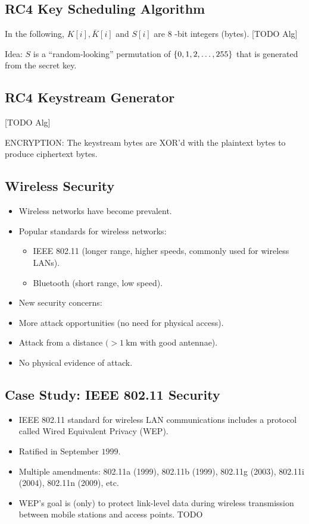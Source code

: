 \subsection*{RC4 Key Scheduling Algorithm}
In the following, $K[i], \bar{K}[i]$ and $S[i]$ are 8 -bit integers (bytes).
      [TODO Alg]

Idea: $S$ is a ``random-looking'' permutation of
$\{0,1,2, \ldots, 255\}$ that is generated from the secret key.

\subsection*{RC4 Keystream Generator}
[TODO Alg]

ENCRYPTION\@: The keystream bytes are XOR'd with the
plaintext bytes to produce ciphertext bytes.

\subsection*{Wireless Security}
\begin{itemize}
      \item Wireless networks have become prevalent.
      \item Popular standards for wireless networks:
            \begin{itemize}
                  \item IEEE 802.11
                        (longer range, higher speeds, commonly used for wireless LANs).
                  \item Bluetooth (short range, low speed).
            \end{itemize}
      \item New security concerns:
      \item More attack opportunities (no need for physical access).
      \item Attack from a distance $(>1 \mathrm{~km}$ with good antennae).
      \item No physical evidence of attack.
\end{itemize}

\subsection*{Case Study: IEEE 802.11 Security}
\begin{itemize}
      \item IEEE 802.11 standard for wireless LAN communications includes a protocol called Wired Equivalent Privacy (WEP).
      \item Ratified in September $1999$.
      \item Multiple amendments: 802.11a (1999), 802.11b (1999),
            802.11g (2003), 802.11i (2004), 802.11n (2009), etc.\
      \item WEP's goal is (only) to protect link-level data during wireless transmission
            between mobile stations and access points.
            TODO
\end{itemize}

